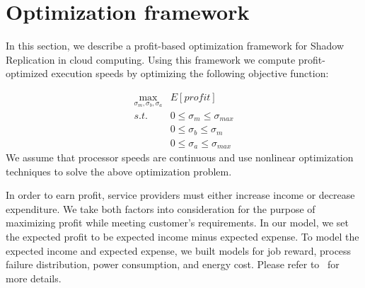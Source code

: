 %

\section{Optimization framework}

In this section, we describe a profit-based optimization framework for
Shadow Replication in cloud computing. Using this
framework we compute profit-optimized execution speeds by
optimizing the following objective function:


\begin{equation}
\label{optimization_problem}
\begin{alignedat}{2}
\max_{\sigma_m,\sigma_b,\sigma_a}     & E[profit] \\
s.t.                                 & 0 \leq \sigma_m \leq \sigma_{max} \\
                                     & 0 \leq \sigma_b \leq \sigma_{m} \\
                                     & 0 \leq \sigma_a \leq \sigma_{max} 
\end{alignedat}
\end{equation}
We assume that processor
speeds are continuous and use nonlinear optimization techniques
to solve the above optimization problem. 

In order to earn profit, service providers must either increase
income or decrease expenditure. We take both factors into
consideration for the purpose of maximizing profit while meeting
customer's requirements. In our model, we set the expected profit to be
expected income minus expected expense. To model the expected income and expected expense, we built models for job reward, process failure distribution, power consumption, and energy cost. Please refer to~\cite{cui_2014_closer} for more details.

